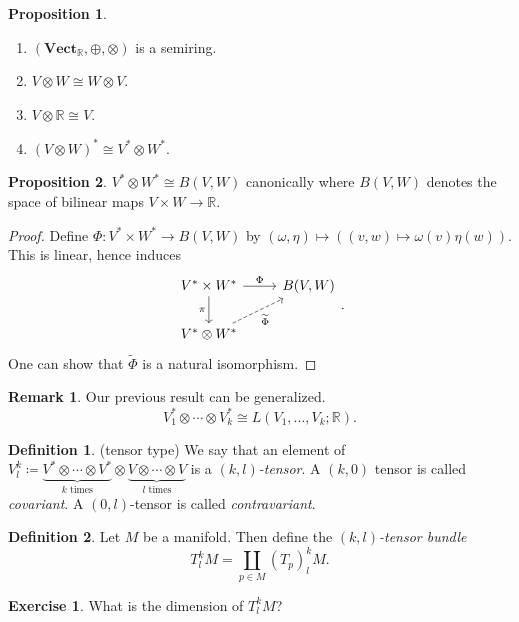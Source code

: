 \documentclass[10pt,letterpaper,cm]{nupset}
\theoremstyle{definition}
\newtheorem*{definition}{Definition}
\newtheorem{remark}{Remark}
\newtheorem{exercise}{Exercise}
\newtheorem{prop}{Proposition}
\newcommand{\R}{\mathbb R}
\newcommand{\1}{\mathbf{1}}
\newcommand{\0}{\vec 0}
\begin{document}
\begin{prop} $ $
\begin{enumerate}
\item $(\mathbf{Vect}_{\R}, \oplus, \otimes)$ is a semiring. 
\item $V \otimes W \cong W \otimes V$.
\item $V \otimes \R \cong V$.
\item $(V \otimes W)^{\ast} \cong V^{\ast} \otimes W^{\ast}$.
\end{enumerate}
\end{prop}

\begin{prop}
$V^{\ast} \otimes W^{\ast} \cong B(V, W)$ canonically where $B(V, W)$ denotes the space of bilinear maps $V \times W \to \R$.
\end{prop}
\begin{proof}
Define $\Phi : V^{\ast} \times W^{\ast} \to B(V, W)$ by $(\omega, \eta) \mapsto ((v, w) \mapsto \omega(v) \eta(w))$.
This is linear, hence induces
\[
\begin{tikzcd}
V^{\ast}\times W^{\ast} \arrow[d, "\pi"'] \arrow[r, "\Phi"] & {B(V, W)} \\
V^{\ast} \otimes W^{\ast} \arrow[ru, "{\widetilde{\Phi}}"', dashed] & 
\end{tikzcd} .
\]
One can show that $\tilde{\Phi}$ is a natural isomorphism.
\end{proof}

\begin{remark}
Our previous result can be generalized. $$V_1^{\ast} \otimes \cdots \otimes V_k^{\ast} \cong L(V_1, \ldots, V_k; \R). $$
\end{remark}

\begin{definition}{(tensor type)}
We say that an element of $V_l^k\coloneqq  \underbrace{V^{\ast} \otimes \cdots \otimes V^{\ast}}_{k \text{ times}} \otimes \underbrace{V \otimes \cdots \otimes V}_{l \text{ times}}$ is a \textit{$(k, l)$-tensor}. A $(k, 0)$ tensor is called \textit{covariant}. A $(0, l)$-tensor is called \textit{contravariant}.
\end{definition}

\begin{definition}
Let $M$ be a manifold. Then define the \textit{$(k, l)$-tensor bundle} $$T _l^k M = \coprod_{p\in M} (T_p)_l^k M.$$
\end{definition}

\begin{exercise}
What is the dimension of $T_l^k M$?
\end{exercise}
\end{document}
